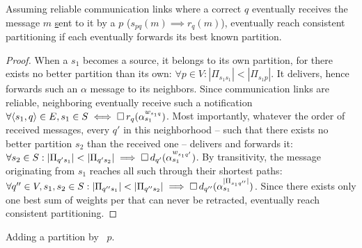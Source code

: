 \begin{theorem}
%
Assuming reliable communication links where a correct \process $q$
eventually receives the message $m$ \underline{s}ent to it by a
\process $p$ ($s_{pq}(m) \implies r_{q}(m)$), \processes eventually
reach consistent partitioning if each \process eventually forwards its
best known partition.
\end{theorem}

 

\begin{proof}
  When a \process $s_1$ becomes a source, it belongs to its own
  partition, for there exists no better partition than its own:
  $\forall p \in V: |\Pi_{s_1 s_1}| < |\Pi_{s_1 p}|$. It delivers,
  hence forwards such an $\alpha$ message to its neighbors. Since
  communication links are reliable, neighboring \processes eventually
  receive such a notification $\forall \langle s_1, q \rangle \in E,
  s_1 \in S \iff \square\, r_q(\alpha_{s_1}^{w_{s_1 q}})$. Most
  importantly, whatever the order of received messages, every \process
  $q'$ in this neighborhood -- such that there exists no better
  partition $s_2$ than the received one -- delivers and forwards it:
  $\forall s_2 \in S: |\Pi_{q' s_1}| < |\Pi_{q' s_2}| \implies
  \square\, d_{q'}(\alpha_{s_1}^{w_{s_1 q'}})$. By transitivity, the
  message originating from $s_1$ reaches all such \processes through
  their shortest paths: $\forall q'' \in V, s_1, s_2 \in S: |\Pi_{q''
    s_1}| < |\Pi_{q'' s_2}| \implies \square\,
  d_{q''}(\alpha_{s_1}^{|\Pi_{s_1 q''}|})$.  Since there exists only
  one best sum of weights per \process that can never be retracted,
  \processes eventually reach consistent partitioning.
\end{proof}

\begin{algorithm}
  
  \caption{\label{algo:add}Adding a partition by \Process~$p$.}
\end{algorithm}

